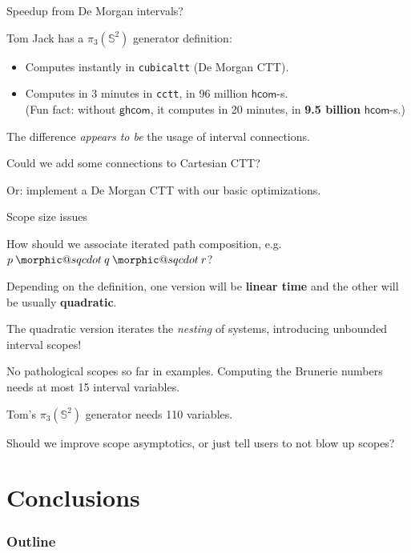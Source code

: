 \documentclass[dvipsnames]{beamer}
\makeatletter
\DeclareRobustCommand{\sqcdot}{\mathbin{\mathpalette\morphic@sqcdot\relax}}
\newcommand{\morphic@sqcdot}[2]{%
  \sbox\z@{$\m@th#1\centerdot$}%
  \ht\z@=.33333\ht\z@
  \vcenter{\box\z@}%
}
\newcommand{\ms}[1]{\mathsf{#1}}
\newcommand{\hcom}{\ms{hcom}}
\newcommand{\ghcom}{\ms{ghcom}}
\makeatother
\begin{document}
\begin{frame}{Speedup from De Morgan intervals?}

Tom Jack has a $\pi_3(\mathbb{S}^2)$ generator definition:
\begin{itemize}
  \item Computes instantly in \texttt{cubicaltt} (De Morgan CTT).
  \item Computes in 3 minutes in \texttt{cctt}, in 96 million $\hcom$-s.\\
        (Fun fact: without $\ghcom$, it computes in 20 minutes, in
         \textbf{9.5 billion} $\hcom$-s.)
\end{itemize}
\vspace{1em}
\pause

The difference \emph{appears to be} the usage of interval connections.
\vspace{1em}

Could we add some connections to Cartesian CTT?
\vspace{1em}

Or: implement a De Morgan CTT with our basic optimizations.

\end{frame}

\begin{frame}{Scope size issues}

How should we associate iterated path composition, e.g.\ $p \sqcdot q \sqcdot r$?
\vspace{1em}
\pause

Depending on the definition, one version will be \textbf{linear time}
and the other will be usually \textbf{quadratic}.
\vspace{1em}
\pause

The quadratic version iterates the \emph{nesting} of systems, introducing
unbounded interval scopes!
\vspace{1em}
\pause

No pathological scopes so far in examples. Computing the Brunerie
numbers needs at most 15 interval variables.
\vspace{1em}
\pause

Tom's $\pi_3(\mathbb{S}^2)$ generator needs 110 variables.
\vspace{1em}
\pause

Should we improve scope asymptotics, or just tell users to not blow up scopes?
\pause

\end{frame}

\section{Conclusions}
\begin{frame}
  \frametitle{Outline}
  \tableofcontents[currentsection]
\end{frame}
\end{document}
